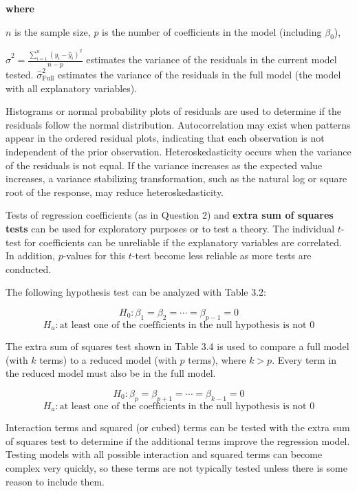 \documentclass[
]{report}
\begin{document}
\vspace{0.5em}

\textbf{where}

\quad \(n\) is the sample size,
\quad \(p\) is the number of coefficients in the model (including \(\beta_0\)),

\(\hat{\sigma}^2 = \frac{\sum_{i=1}^n (y_i - \hat{y}_i)^2}{n - p}\) estimates the variance of the residuals in the current model tested.
\(\hat{\sigma}_{\text{Full}}^2\) estimates the variance of the residuals in the full model (the model with all explanatory variables).

Histograms or normal probability plots of residuals are used to determine if the residuals follow the normal distribution. Autocorrelation may exist when patterns appear in the ordered residual plots, indicating that each observation is not independent of the prior observation. Heteroskedasticity occurs when the variance of the residuals is not equal. If the variance increases as the expected value increases, a variance stabilizing transformation, such as the natural log or square root of the response, may reduce heteroskedasticity.

Tests of regression coefficients (as in Question 2) and \textbf{extra sum of squares tests} can be used for exploratory purposes or to test a theory. The individual \(t\)-test for coefficients can be unreliable if the explanatory variables are correlated. In addition, \(p\)-values for this \(t\)-test become less reliable as more tests are conducted.

The following hypothesis test can be analyzed with Table 3.2:

\[
H_0\!: \beta_1 = \beta_2 = \cdots = \beta_{p-1} = 0
\]
\[
H_a\!: \text{at least one of the coefficients in the null hypothesis is not 0}
\]

The extra sum of squares test shown in Table 3.4 is used to compare a full model (with \(k\) terms) to a reduced model (with \(p\) terms), where \(k > p\). Every term in the reduced model must also be in the full model.

\[
H_0\!: \beta_p = \beta_{p+1} = \cdots = \beta_{k-1} = 0
\]
\[
H_a\!: \text{at least one of the coefficients in the null hypothesis is not 0}
\]

Interaction terms and squared (or cubed) terms can be tested with the extra sum of squares test to determine if the additional terms improve the regression model. Testing models with all possible interaction and squared terms can become complex very quickly, so these terms are not typically tested unless there is some reason to include them.
\end{document}
